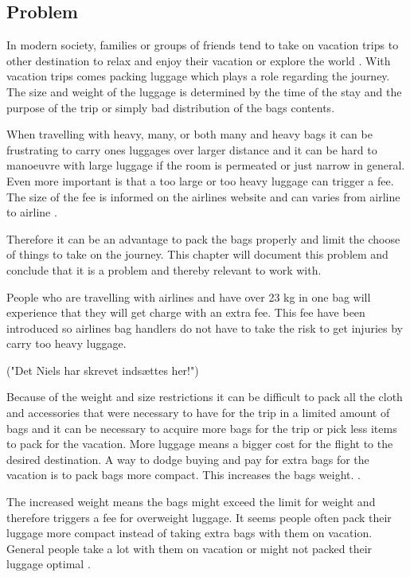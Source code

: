 \subsection{Problem}
In modern society, families or groups of friends tend to take on vacation trips to other destination to relax and enjoy their vacation or explore the world \citep{danskecharter}.
With vacation trips comes packing luggage which plays a role regarding the journey. The size and weight of the luggage is determined by the time of the stay and the purpose of the trip or simply bad distribution of the bags contents.

When travelling with heavy, many, or both many and heavy bags it can be frustrating to carry ones luggages over larger distance and it can be hard to manoeuvre with large luggage if the room is permeated or just narrow in general. Even more important is that a too large or too heavy luggage can trigger a fee. The size of the fee is informed on the airlines website and can varies from airline to airline \citep{altombag}.

Therefore it can be an advantage to pack the bags properly and limit the choose of things to take on the journey.
This chapter will document this problem and conclude that it is a problem and thereby relevant to work with.

People who are travelling with airlines and have over 23 kg in one bag will experience that they will get charge with an extra fee. This fee have been introduced so airlines bag handlers do not have to take the risk to get injuries by carry too heavy luggage.

("Det Niels har skrevet indsættes her!")

Because of the weight and size restrictions it can be difficult to pack all the cloth and accessories that were necessary to have for the trip in a limited amount of bags and it can be necessary to acquire more bags for the trip or pick less items to pack for the vacation. More luggage means a bigger cost for the flight to the desired destination. A way to dodge buying and pay for extra bags for the vacation is to pack bags more compact. This increases the bags weight. \citep{altombag}.

The increased weight means the bags might exceed the limit for weight and therefore triggers a fee for overweight luggage.
It seems people often pack their luggage more compact instead of taking extra bags with them on vacation. General people take a lot with them on vacation or might not packed their luggage optimal \citep{airstat}.

